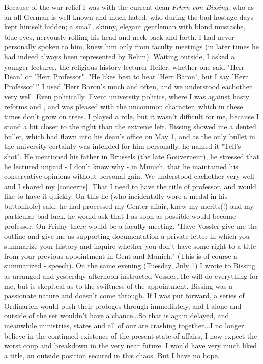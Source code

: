 Because of the war-relief I was with the current dean \textit{Frhrn von Bissing}, who as an all-German is well-known and much-hated, who during the bad hostage days kept himself hidden; a small, skinny, elegant gentleman with blond mustache, blue eyes, nervously rolling his head and neck back and forth. I had never personally spoken to him, knew him only from faculty meetings (in later times he had indeed always been represented by Rehm). Waiting outside, I asked a younger lecturer, the religious history lecturer Heiler, whether one said "Herr Dean" or "Herr Professor". "He likes best to hear 'Herr Baron', but I say 'Herr Professor'!"
I used 'Herr Baron's much and often, and we understood eachother very well. Even politically. Event university politics, where I was against hasty reforms and , and was pleased with the uncommon character, which in these times don't grow on trees. I played a role, but it wasn't difficult for me, because I stand a bit closer to the right than the extreme left. Bissing showed me a dented bullet, which had flown into his dean's office on May 1, and as the only bullet in the university certainly was intended for him personally, he named it "Tell's shot". He mentioned his father in Brussels (the late Gouverneur), he stressed that he lectured unpaid - I don't know why - in Munich, that he maintained his conservative opinions without personal gain. We understood eachother very well and I shared my [concerns]. That I need to have the title of professor, and would like to have it quickly. On this he (who incidentally wore a medal in his buttonhole) said: he had processed my Genter affair, knew my merits(!) and my particular bad luck, he would ask that I as soon as possible would become professor. On Friday there would be a faculty meeting. "Have Vossler give me the outline and give me as supporting documentation a private letter in which you summarize your history and inquire whether you don't have some right to a title from your previous appointment in Gent and Munich." (This is of course a summarized -  speech). On the same evening (Tuesday, July 1) I wrote to Bissing as arranged and yesterdqy afternoon instructed Vossler. He will do everything for me, but is skepitcal as to the swiftness of the appointment. Bissing was a passionate nature and doesn't come through. If I was put forward, a series of Ordinarien would push their protoges through immediately, and I alone and outside of the set wouldn't have a chance...So that is again delayed, and meanwhile ministries, states and all of our  are crashing together...I no longer believe in the continued existence of the present state of affairs, I now expect the worst coup and breakdown in the very near future. I would have very much liked a title, an outside position secured in this chaos. But I have no hope.

